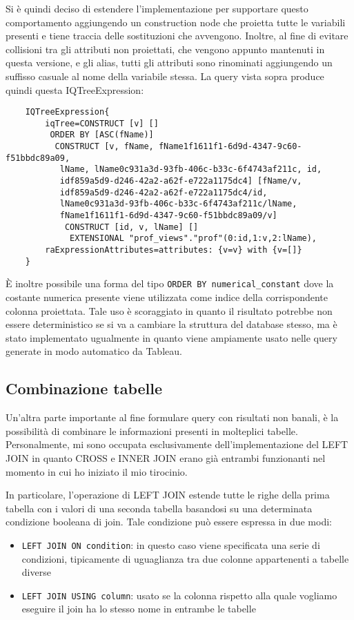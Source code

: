 Si è quindi deciso di estendere l'implementazione per supportare questo comportamento aggiungendo un construction node che proietta tutte le variabili presenti e tiene traccia delle sostituzioni che
avvengono. Inoltre, al fine di evitare collisioni tra gli attributi non proiettati, che vengono appunto mantenuti in questa versione, e gli alias, tutti gli attributi sono rinominati aggiungendo un
suffisso casuale al nome della variabile stessa. La query vista sopra produce quindi questa IQTreeExpression:
\begin{verbatim}
    IQTreeExpression{
        iqTree=CONSTRUCT [v] []
         ORDER BY [ASC(fName)]
          CONSTRUCT [v, fName, fName1f1611f1-6d9d-4347-9c60-f51bbdc89a09, 
           lName, lName0c931a3d-93fb-406c-b33c-6f4743af211c, id, 
           idf859a5d9-d246-42a2-a62f-e722a1175dc4] [fName/v, 
           idf859a5d9-d246-42a2-a62f-e722a1175dc4/id, 
           lName0c931a3d-93fb-406c-b33c-6f4743af211c/lName, 
           fName1f1611f1-6d9d-4347-9c60-f51bbdc89a09/v]
            CONSTRUCT [id, v, lName] []
             EXTENSIONAL "prof_views"."prof"(0:id,1:v,2:lName), 
        raExpressionAttributes=attributes: {v=v} with {v=[]}
    } 
\end{verbatim}

\`E inoltre possibile una forma del tipo \verb+ORDER BY numerical_constant+ dove la costante numerica presente viene utilizzata come indice della corrispondente colonna proiettata. Tale
uso è scoraggiato in quanto il risultato potrebbe non essere deterministico se si va a cambiare la struttura del database stesso, ma è stato implementato ugualmente in quanto viene
ampiamente usato nelle query generate in modo automatico da Tableau.

\subsection{Combinazione tabelle}
Un'altra parte importante al fine formulare query con risultati non banali, è la possibilità di combinare le informazioni presenti in molteplici tabelle. Personalmente, mi sono occupata
esclusivamente dell'implementazione del LEFT JOIN in quanto CROSS e INNER JOIN erano già entrambi funzionanti nel momento in cui ho iniziato il mio tirocinio.

In particolare, l'operazione di LEFT JOIN estende tutte le righe della prima tabella con i valori di una seconda tabella basandosi su una determinata condizione booleana di join. Tale condizione
può essere espressa in due modi:
\begin{itemize}
    \item \verb+LEFT JOIN ON condition+: in questo caso viene specificata una serie di condizioni, tipicamente di uguaglianza tra due colonne appartenenti a tabelle diverse
    \item \verb+LEFT JOIN USING column+: usato se la colonna rispetto alla quale vogliamo eseguire il join ha lo stesso nome in entrambe le tabelle
\end{itemize}

